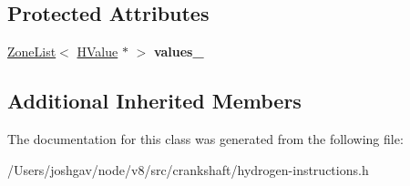 \subsection*{Protected Attributes}
\begin{DoxyCompactItemize}
\item 
\hyperlink{classv8_1_1internal_1_1_zone_list}{Zone\+List}$<$ \hyperlink{classv8_1_1internal_1_1_h_value}{H\+Value} $\ast$ $>$ {\bfseries values\+\_\+}\hypertarget{classv8_1_1internal_1_1_h_dematerialized_object_a9d4594d10a05051dac2f37690acac70c}{}\label{classv8_1_1internal_1_1_h_dematerialized_object_a9d4594d10a05051dac2f37690acac70c}

\end{DoxyCompactItemize}
\subsection*{Additional Inherited Members}


The documentation for this class was generated from the following file\+:\begin{DoxyCompactItemize}
\item 
/\+Users/joshgav/node/v8/src/crankshaft/hydrogen-\/instructions.\+h\end{DoxyCompactItemize}
